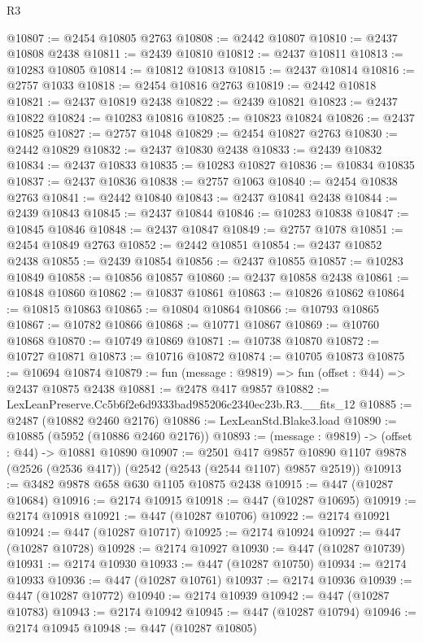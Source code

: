 \begin{lexlean}{R3}
\begin{coremodule}
@10807 := @2454 @10805 @2763
@10808 := @2442 @10807
@10810 := @2437 @10808 @2438
@10811 := @2439 @10810
@10812 := @2437 @10811
@10813 := @10283 @10805
@10814 := @10812 @10813
@10815 := @2437 @10814
@10816 := @2757 @1033
@10818 := @2454 @10816 @2763
@10819 := @2442 @10818
@10821 := @2437 @10819 @2438
@10822 := @2439 @10821
@10823 := @2437 @10822
@10824 := @10283 @10816
@10825 := @10823 @10824
@10826 := @2437 @10825
@10827 := @2757 @1048
@10829 := @2454 @10827 @2763
@10830 := @2442 @10829
@10832 := @2437 @10830 @2438
@10833 := @2439 @10832
@10834 := @2437 @10833
@10835 := @10283 @10827
@10836 := @10834 @10835
@10837 := @2437 @10836
@10838 := @2757 @1063
@10840 := @2454 @10838 @2763
@10841 := @2442 @10840
@10843 := @2437 @10841 @2438
@10844 := @2439 @10843
@10845 := @2437 @10844
@10846 := @10283 @10838
@10847 := @10845 @10846
@10848 := @2437 @10847
@10849 := @2757 @1078
@10851 := @2454 @10849 @2763
@10852 := @2442 @10851
@10854 := @2437 @10852 @2438
@10855 := @2439 @10854
@10856 := @2437 @10855
@10857 := @10283 @10849
@10858 := @10856 @10857
@10860 := @2437 @10858 @2438
@10861 := @10848 @10860
@10862 := @10837 @10861
@10863 := @10826 @10862
@10864 := @10815 @10863
@10865 := @10804 @10864
@10866 := @10793 @10865
@10867 := @10782 @10866
@10868 := @10771 @10867
@10869 := @10760 @10868
@10870 := @10749 @10869
@10871 := @10738 @10870
@10872 := @10727 @10871
@10873 := @10716 @10872
@10874 := @10705 @10873
@10875 := @10694 @10874
@10879 := fun (message : @9819) => fun (offset : @44) => @2437 @10875 @2438
@10881 := @2478 @417 @9857
@10882 := LexLeanPreserve.Cc5b6f2e6d9333bad985206c2340ec23b.R3.__fits_12
@10885 := @2487 (@10882 @2460 @2176)
@10886 := LexLeanStd.Blake3.load
@10890 := @10885 (@5952 (@10886 @2460 @2176))
@10893 := (message : @9819) -> (offset : @44) -> @10881 @10890
@10907 := @2501
    @417
    @9857
    @10890
    @1107
    @9878
    (@2526 (@2536 @417))
    (@2542 (@2543 (@2544 @1107) @9857 @2519))
@10913 := @3482 @9878 @658 @630 @1105 @10875 @2438
@10915 := @447 (@10287 @10684)
@10916 := @2174 @10915
@10918 := @447 (@10287 @10695)
@10919 := @2174 @10918
@10921 := @447 (@10287 @10706)
@10922 := @2174 @10921
@10924 := @447 (@10287 @10717)
@10925 := @2174 @10924
@10927 := @447 (@10287 @10728)
@10928 := @2174 @10927
@10930 := @447 (@10287 @10739)
@10931 := @2174 @10930
@10933 := @447 (@10287 @10750)
@10934 := @2174 @10933
@10936 := @447 (@10287 @10761)
@10937 := @2174 @10936
@10939 := @447 (@10287 @10772)
@10940 := @2174 @10939
@10942 := @447 (@10287 @10783)
@10943 := @2174 @10942
@10945 := @447 (@10287 @10794)
@10946 := @2174 @10945
@10948 := @447 (@10287 @10805)

\end{coremodule}
\end{lexlean}
